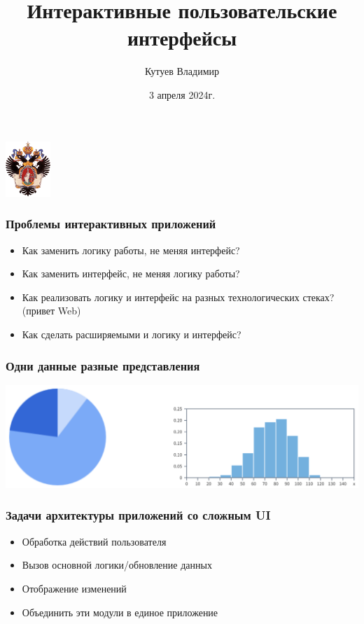 \documentclass[aspectratio=169]{beamer}
\title[UI]{Интерактивные пользовательские интерфейсы}
\subtitle[]{}
\institute[СПбГУ]{
Программная инженерия \\
Санкт-Петербургский государственный университет
}
\author[Кутуев Владимир]{Кутуев Владимир}
\date{3 апреля 2024г.}
\begin{document}
{
\begin{frame}
  \includegraphics[width=1.7cm]{pictures/SPbGU_Logo.png}
  \vspace{-20pt}
  \begin{center}
    \titlepage
  \end{center}
\end{frame}
}

\begin{frame}[fragile]
  \transwipe[direction=90]
  \frametitle{Проблемы интерактивных приложений}
  
  \begin{itemize}
    \item Как заменить логику работы, не меняя интерфейс?
    \item Как заменить интерфейс, не меняя логику работы?
    \item Как реализовать логику и интерфейс на разных технологических стеках? (привет Web)
    \item Как сделать расширяемыми и логику и интерфейс?
  \end{itemize}

\end{frame}

\begin{frame}[fragile]
  \transwipe[direction=90]
  \frametitle{Одни данные разные представления}
  \includegraphics[width=.9\textwidth]{pictures/StatisticsView.png}

\end{frame}


\begin{frame}[fragile]
  \transwipe[direction=90]
  \frametitle{Задачи архитектуры приложений со сложным UI}
  
  \begin{itemize}
    \item Обработка действий пользователя
    \item Вызов основной логики/обновление данных
    \item Отображение изменений
    \item Объединить эти модули в единое приложение
  \end{itemize}

\end{frame}
\end{document}
